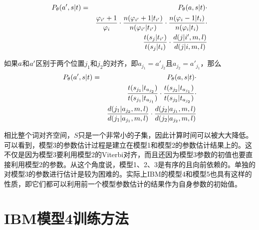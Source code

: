 \begin{appendices}
\begin{eqnarray}
{P}_{\theta}({a}',{s}|{t}) & = & {P}_{\theta}({a},{s}|{t}) \cdot  \nonumber \\
                                                                                   &     & \frac{\varphi_{i'}+1}{\varphi_i} \cdot \frac{n(\varphi_{i'}+1|t_{i'})}{n(\varphi_{i'}|t_{i'})} \cdot \frac{n(\varphi_{i}-1|t_{i})}{n(\varphi_{i}|t_{i})} \cdot \nonumber \\
                                                                                   &     & \frac{t(s_j|t_{i'})}{t(s_{j}|t_{i})} \cdot \frac{d(j|i',m,l)}{d(j|i,m,l)}
\label{eq:1.13}
\end{eqnarray}

\parinterval 如果${a}$和${a}'$区别于两个位置$j_1$和$j_2$的对齐，即$a_{j_{1}}=a'_{j_{2}}$且$a_{j_{2}}=a'_{j_{1}}$，那么
\begin{eqnarray}
{P}_{\theta}({a}',{s}|{t}) &=& {P}_{\theta}({a},{s}|{t}) \cdot \nonumber \\
                                                                 &  & \frac{t(s_{j_{1}}|t_{a_{j_{2}}})}{t(s_{j_{1}}|t_{a_{j_{1}}})} \cdot \frac{t(s_{j_{2}}|t_{a_{j_{1}}})}{t(s_{j_{2}}|t_{a_{j_{2}}})} \cdot \nonumber \\
                                                                 &  & \frac{d(j_{1}|a_{j_{2}},m,l)}{d(j_{1}|a_{j_{1}},m,l)} \cdot \frac{d(j_{2}|a_{j_{1}},m,l)}{d(j_{2}|a_{j_{2}},m,l)}
\label{eq:1.14}
\end{eqnarray}

\parinterval 相比整个词对齐空间，$S$只是一个非常小的子集，因此计算时间可以被大大降低。可以看到，模型3的参数估计过程是建立在模型1和模型2的参数估计结果上的。这不仅是因为模型3要利用模型2的Viterbi对齐，而且还因为模型3参数的初值也要直接利用模型2的参数。从这个角度说，模型1、2、3是有序的且向前依赖的。单独的对模型3的参数进行估计是较为困难的。实际上IBM的模型4和模型5也具有这样的性质，即它们都可以利用前一个模型参数估计的结果作为自身参数的初始值。


\section{IBM模型4训练方法}


\end{appendices}
